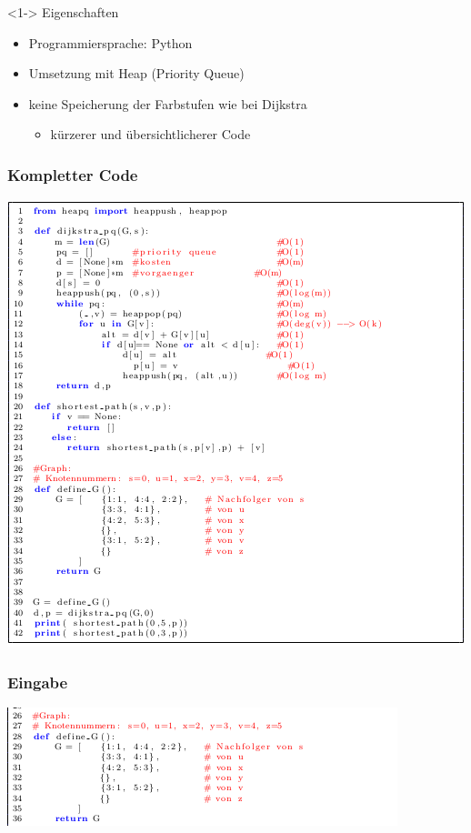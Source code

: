 \begin{frame}
	\begin{block} <1-> {Eigenschaften}
		\begin{itemize}
			\item <2-> Programmiersprache: Python
			\item <3-> Umsetzung mit Heap (Priority Queue)
			\item <4-> keine Speicherung der Farbstufen wie bei Dijkstra
				\begin{itemize}
					\item <5-> kürzerer und übersichtlicherer Code
				\end{itemize}
		\end{itemize}
	\end{block}	
\end{frame}


\begin{frame}
\frametitle{Kompletter Code}
		\centering
		\includegraphics[scale=0.4]{./pictures/Impl.png}
\end{frame}


\begin{frame}
	\frametitle{Eingabe}
	\centering
	\includegraphics[scale=0.8]{./pictures/Eingabe.png}
\end{frame}


